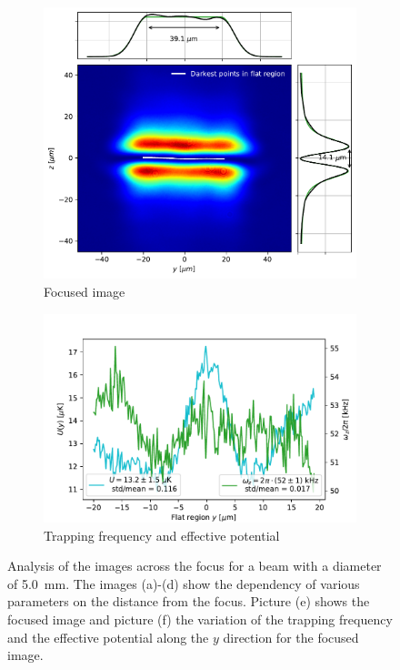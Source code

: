 \begin{figure}
    \begin{subfigure}{0.5\textwidth}
        \includegraphics[width=\textwidth]{chapters/chapter_3/figures/focused_anal.pdf}
        \caption{Focused image}
        \label{fig:focus_image}
    \end{subfigure}
    \begin{subfigure}{0.5\textwidth}
        \includegraphics[width=\textwidth]{chapters/chapter_3/figures/omega_U_5focus.pdf}
        \caption{Trapping frequency and effective potential}
        \label{fig:focus_U_omega}
    \end{subfigure}
    \caption{Analysis of the images across the focus for a beam with a diameter of \SI{5.0}{mm}. The images (a)-(d) show the dependency of various parameters on the distance from the focus. Picture (e) shows the focused image and picture (f) the variation of the trapping frequency and the effective potential along the $y$ direction for the focused image.}
    \label{fig:analysis_focus}
\end{figure}

